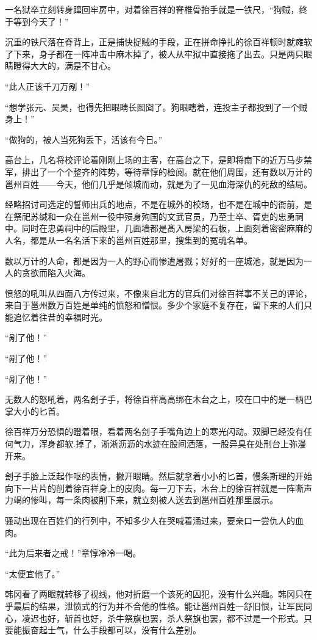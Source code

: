 一名狱卒立刻转身蹿回牢房中，对着徐百祥的脊椎骨抬手就是一铁尺，“狗贼，终于等到今天了！”

沉重的铁尺落在脊背上，正是捕快捉贼的手段，正在拼命挣扎的徐百祥顿时就瘫软了下来，身子都在一阵冲击中麻木掉了，被人从牢狱中直接拖了出去。只是两只眼睛瞪得大大的，满是不甘心。

“此人正该千刀万剐！”

“想学张元、吴昊，也得先把眼睛长囫囵了。狗眼瞎着，连投主子都投到了一个贼身上！”

“做狗的，被人当死狗丢下，活该有今日。”

高台上，几名将校评论着刚刚上场的主客，在高台之下，是即将南下的近万马步禁军，排出了一个个整齐的阵势，等待章惇的检阅。就在他们周围，还有数以万计的邕州百姓——今天，他们几乎是倾城而动，就是为了一见血海深仇的死敌的结局。

经略招讨司选定的誓师出兵的地点，不是在城外的校场，也不是在城中的衙前，是在祭祀苏缄和一众在邕州一役中殒身殉国的文武官员，乃至士卒、胥吏的忠勇祠中。同时在忠勇祠中的后殿里，几面墙都是髙入房梁的石板，上面刻着密密麻麻的人名，都是从一名名活下来的邕州百姓那里，搜集到的冤魂名单。

数以万计的人命，都是因为一人的野心而惨遭屠戮；好好的一座城池，就是因为一人的贪欲而陷入火海。

愤怒的吼叫从四面八方传过来，不像来自北方的官兵们对徐百祥事不关己的评论，来自于邕州数万百姓是单纯的愤怒和憎恨。多少个家庭不复存在，留下来的人们只能追忆着往昔的幸福时光。

“剐了他！”

“剐了他！”

“剐了他！”

无数人的怒吼着，两名刽子手，将徐百祥高高绑在木台之上，咬在口中的是一柄巴掌大小的匕首。

徐百祥万分恐惧的瞪着眼，看着两名刽子手嘴角边上的寒光闪动。双脚已经没有任何气力，浑身都软.掉了，淅淅沥沥的水迹在股间洒落，一股异臭在处刑台上弥漫开来。

刽子手脸上泛起作呕的表情，撇开眼睛。然后就拿着小小的匕首，慢条斯理的开始向下一片片的削着徐百祥身上的皮肉。每一刀下去，木台上的徐百祥就是一阵嘶声力竭的惨叫，每一条肉被削下来，就立刻被人送去到邕州百姓那里展示。

骚动出现在百姓们的行列中，不知多少人在哭喊着涌过来，要亲口一尝仇人的血肉。

“此为后来者之戒！”章惇冷冷一喝。

“太便宜他了。”

韩冈看了两眼就转移了视线，他对折磨一个该死的囚犯，没有什么兴趣。韩冈只在乎最后的结果，泄愤式的行为并不合他的性格。能让邕州百姓一舒旧恨，让军民同心，凌迟也好，斩首也好，杀牛祭旗也罢，杀人祭旗也罢，都不过是一个形式。只要能振奋起士气，什么手段都可以，没有什么差别。

